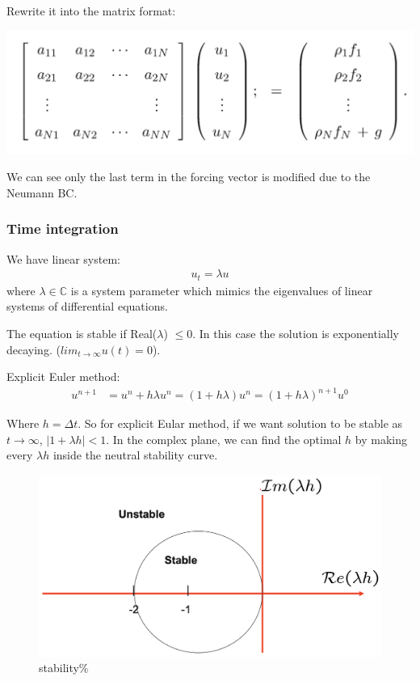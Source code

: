 \documentclass[
  a4paper,
  10pt]{article}
\begin{document}
Rewrite it into the matrix format:

\includegraphics{figs/ee2417c98a1e9e26931e69be51638abdfd2367c9.png}

We can see only the last term in the forcing vector is modified due to
the Neumann BC.

\hypertarget{time-integration}{%
\subsubsection{Time integration}\label{time-integration}}

We have linear system: \begin{align}
u_t = \lambda u
\end{align} where \(\lambda\in\mathbb{C}\) is a system parameter which
mimics the eigenvalues of linear systems of differential equations.

The equation is stable if Real(\(\lambda\)) \(\leq 0\). In this case the
solution is exponentially decaying. (\(lim_{t\to\infty}u(t) = 0\)).

Explicit Euler method: \begin{align}
u^{n+1} &= u^{n} + h\lambda u^{n}
=(1+h\lambda)u^{n}
=(1+h\lambda)^{n+1}u^0
\end{align}

Where \(h=\Delta t\). So for explicit Eular method, if we want solution
to be stable as \(t\to\infty\), \(|1+\lambda h|<1\). In the complex
plane, we can find the optimal \(h\) by making every \(\lambda h\)
inside the neutral stability curve.

\begin{figure}
\centering
\includegraphics{figs/0d2289a81eb4c5c10c4430bc8fdffb2cc397e0ba.png}
\caption{stability\%}
\end{figure}
\end{document}
